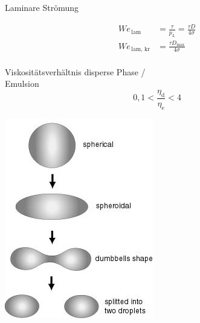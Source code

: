 \documentclass{beamer} %
\newcommand{\tx}[1]{\textrm{#1}}
\begin{document}
\begin{frame}{Laminare Strömung}
	\begin{minipage}{0.7\linewidth}
		\begin{equation*}
		\begin{aligned}
		We_{\,\tx{lam}} &= \frac{\tau}{p_L} = \frac{\tau D}{4 \sigma} \\
		We_{\,\tx{lam, kr}} &= \frac{\tau D_{\tx{max}}}{4 \sigma}
		\end{aligned}
		\end{equation*}
		\vspace{0.5cm}\\
		Viskositätsverhältnis disperse Phase / \\
		Emulsion
		\vspace{0.5cm}
		\begin{equation*}
		0,1 < \frac{\eta_{\tx{d}}}{\eta_{\tx{e}}} < 4
		\end{equation*}
	\end{minipage}%
	\begin{minipage}{0.3\linewidth}
		\includegraphics[width=\linewidth]{Markus/liquid_drop_E}
	\end{minipage}
\end{frame}
\end{document}
